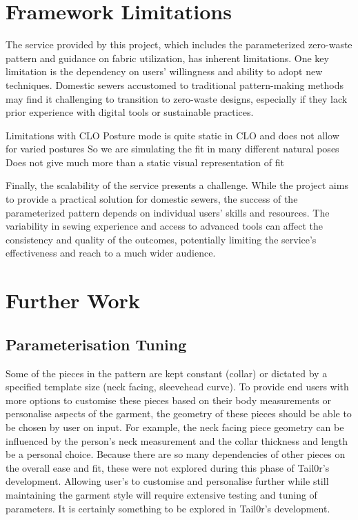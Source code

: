 \section{Framework Limitations}

The service provided by this project, which includes the parameterized zero-waste pattern and guidance on fabric utilization, has inherent limitations. One key limitation is the dependency on users’ willingness and ability to adopt new techniques. Domestic sewers accustomed to traditional pattern-making methods may find it challenging to transition to zero-waste designs, especially if they lack prior experience with digital tools or sustainable practices.

Limitations with CLO
Posture mode is quite static in CLO and does not allow for varied postures
So we are simulating the fit in many different natural poses
Does not give much more than a static visual representation of fit

Finally, the scalability of the service presents a challenge. While the project aims to provide a practical solution for domestic sewers, the success of the parameterized pattern depends on individual users’ skills and resources. The variability in sewing experience and access to advanced tools can affect the consistency and quality of the outcomes, potentially limiting the service’s effectiveness and reach to a much wider audience.

\section{Further Work}

\subsection{Parameterisation Tuning}
Some of the pieces in the pattern are kept constant (collar) or dictated by a specified template size (neck facing, sleevehead curve). To provide end users with more options to customise these pieces based on their body measurements or personalise aspects of the garment, the geometry of these pieces should be able to be chosen by user on input. For example, the neck facing piece geometry can be influenced by the person's neck measurement and the collar thickness and length be a personal choice. Because there are so many dependencies of other pieces on the overall ease and fit, these were not explored during this phase of Tail0r's development. Allowing user's to customise and personalise further while still maintaining the garment style will require extensive testing and tuning of parameters. It is certainly something to be explored in Tail0r's development.

